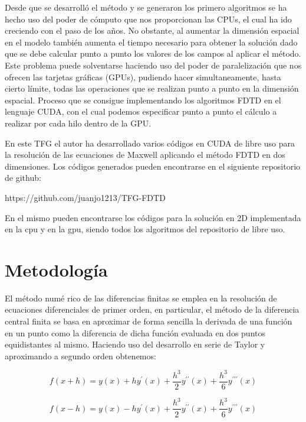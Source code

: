 \documentclass[11pt,a4paper,twoside,pdf]{article}
\numberwithin{equation}{section}
\begin{document}
Desde que se desarrolló el método y se generaron los primero algoritmos se ha hecho uso del poder de cómputo que nos proporcionan las CPUs, el cual ha ido creciendo con el paso de los años. No obstante, al aumentar la dimensión espacial en el modelo también aumenta el tiempo necesario para obtener la solución dado que se debe calcular punto a punto los valores de los campos al aplicar el método. Este problema puede solventarse haciendo uso del poder de paralelización que nos ofrecen las tarjetas gráficas (GPUs), pudiendo hacer simultaneamente, hasta cierto límite, todas las operaciones que se realizan punto a punto en la dimensión espacial. Proceso que se consigue implementando los algoritmos FDTD en el lenguaje CUDA, con el cual podemos especificar punto a punto el cálculo a realizar por cada hilo dentro de la GPU.

En este TFG el autor ha desarrollado varios códigos en CUDA de libre uso para la resolución de las ecuaciones de Maxwell aplicando el método FDTD en dos dimensiones. Los códigos generados pueden encontrarse en el siguiente repositorio de github:

https://github.com/juanjo1213/TFG-FDTD

En el mismo pueden encontrarse los códigos para la solución en 2D implementada en la cpu y en la gpu, siendo todos los algoritmos del repositorio de libre uso.

\newpage




\section{Metodología}
El método numé rico de las diferencias finitas se emplea en la resolución de ecuaciones diferenciales de primer orden, en particular, el método de la diferencia central finita se basa en aproximar de forma sencilla la derivada de una función en un punto como la diferencia de dicha función evaluada en dos puntos equidistantes al mismo. Haciendo uso del desarrollo en serie de Taylor y aproximando a segundo orden obtenemos:

\begin{equation}
f(x+h)=y(x)+hy^\prime(x)+\frac{h^3}{2}y^{\prime\prime}(x)+\frac{h^3}{6}y^{\prime\prime\prime}(x)
\end{equation}

\begin{equation}
f(x-h)=y(x)-hy^\prime(x)+\frac{h^3}{2}y^{\prime\prime}(x)+\frac{h^3}{6}y^{\prime\prime\prime}(x)
\end{equation}
\end{document}

